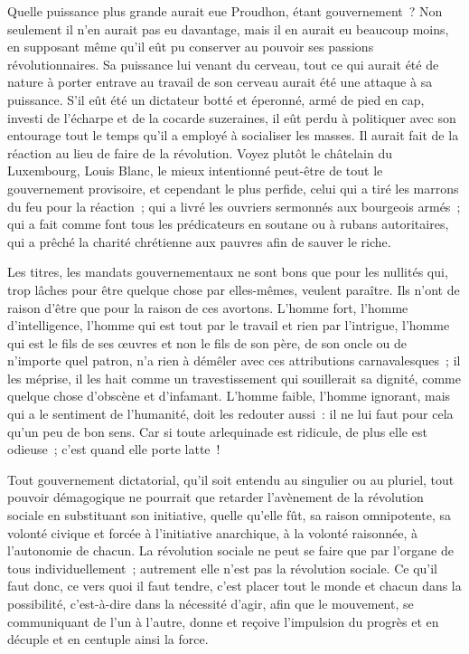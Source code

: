 \documentclass[french,twoside]{book} %
\begin{document}
Quelle puissance plus grande aurait eue Proudhon, étant gouvernement ? Non seulement il n’en aurait pas eu davantage, mais il en aurait eu beaucoup moins, en supposant même qu’il eût pu conserver au pouvoir ses passions révolutionnaires. Sa puissance lui venant du cerveau, tout ce qui aurait été de nature à porter entrave au travail de son cerveau aurait été une attaque à sa puissance. S’il eût été un dictateur botté et éperonné, armé de pied en cap, investi de l’écharpe et de la cocarde suzeraines, il eût perdu à politiquer avec son entourage tout le temps qu’il a employé à socialiser les masses. Il aurait fait de la réaction au lieu de faire de la révolution. Voyez plutôt le châtelain du Luxembourg, Louis Blanc, le mieux intentionné peut-être de tout le gouvernement provisoire, et cependant le plus perfide, celui qui a tiré les marrons du feu pour la réaction ; qui a livré les ouvriers sermonnés aux bourgeois armés ; qui a fait comme font tous les prédicateurs en soutane ou à rubans autoritaires, qui a prêché la charité chrétienne aux pauvres afin de sauver le riche.\par
Les titres, les mandats gouvernementaux ne sont bons que pour les nullités qui, trop lâches pour être quelque chose par elles-mêmes, veulent paraître. Ils n’ont de raison d’être que pour la raison de ces avortons. L’homme fort, l’homme d’intelligence, l’homme qui est tout par le travail et rien par l’intrigue, l’homme qui est le fils de ses œuvres et non le fils de son père, de son oncle ou de n’importe quel patron, n’a rien à démêler avec ces attributions carnavalesques ; il les méprise, il les hait comme un travestissement qui souillerait sa dignité, comme quelque chose d’obscène et d’infamant. L’homme faible, l’homme ignorant, mais qui a le sentiment de l’humanité, doit les redouter aussi : il ne lui faut pour cela qu’un peu de bon sens. Car si toute arlequinade est ridicule, de plus elle est odieuse ; c’est quand elle porte latte !\par
Tout gouvernement dictatorial, qu’il soit entendu au singulier ou au pluriel, tout pouvoir démagogique ne pourrait que retarder l’avènement de la révolution sociale en substituant son initiative, quelle qu’elle fût, sa raison omnipotente, sa volonté civique et forcée à l’initiative anarchique, à la volonté raisonnée, à l’autonomie de chacun. La révolution sociale ne peut se faire que par l’organe de tous individuellement ; autrement elle n’est pas la révolution sociale. Ce qu’il faut donc, ce vers quoi il faut tendre, c’est placer tout le monde et chacun dans la possibilité, c’est-à-dire dans la nécessité d’agir, afin que le mouvement, se communiquant de l’un à l’autre, donne et reçoive l’impulsion du progrès et en décuple et en centuple ainsi la force.\par
\end{document}

